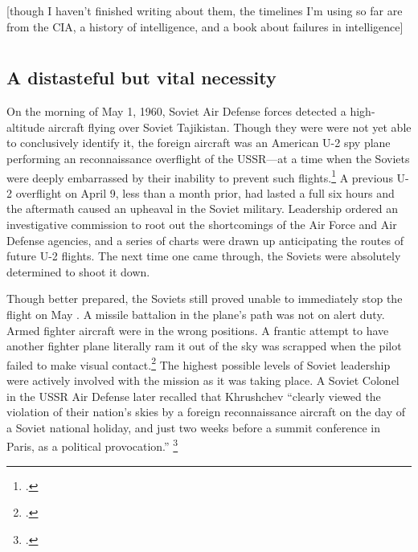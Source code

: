 \documentclass[12pt]{article}
\begin{document}
[though I haven't finished writing about them, the timelines I'm using so far are from the CIA, a history of intelligence, and a book about failures in intelligence]


\section{}



\subsection{A distasteful but vital necessity}
On the morning of May 1, 1960, Soviet Air Defense forces detected a high-altitude aircraft flying over Soviet Tajikistan. Though they were were not yet able to conclusively identify it, the foreign aircraft was an American U-2 spy plane performing an reconnaissance overflight of the USSR---at a time when the Soviets were deeply embarrassed by their inability to prevent such flights.\footcite{orlov_u-2_2007} A previous U-2 overflight on April 9, less than a month prior, had lasted a full six hours and the aftermath caused an upheaval in the Soviet military. Leadership ordered an investigative commission to root out the shortcomings of the Air Force and Air Defense agencies, and a series of charts were drawn up anticipating the routes of future U-2 flights. The next time one came through, the Soviets were absolutely determined to shoot it down.

Though better prepared, the Soviets still proved unable to immediately stop the flight on May . A missile battalion in the plane's path was not on alert duty. Armed fighter aircraft were in the wrong positions. A frantic attempt to have another fighter plane literally ram it out of the sky was scrapped when the pilot failed to make visual contact.\footcite{orlov_u-2_2007} The highest possible levels of Soviet leadership were actively involved with the mission as it was taking place. A Soviet Colonel in the USSR Air Defense later recalled that Khrushchev ``clearly viewed the violation of their nation's skies by a foreign reconnaissance aircraft on the day of a Soviet national holiday, and just two weeks before a summit conference in Paris, as a political provocation.'' \footcite{orlov_u-2_2007}
\end{document}
